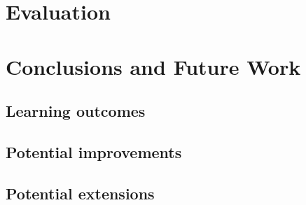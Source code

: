 \documentclass{report}
\begin{document}
\chapter{Evaluation}


\chapter{Conclusions and Future Work}
\section{Learning outcomes}
\section{Potential improvements}
\section{Potential extensions}


\begin{thebibliography}{9}
\end{thebibliography}


\appendix

\end{document}
